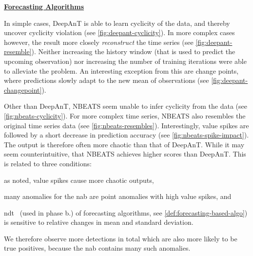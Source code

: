 \bigskip
{\large\uline{\textbf{Forecasting Algorithms}}}\\
\begin{description}[style=unboxed,leftmargin=0cm]
    \item[DeepAnT] In simple cases, DeepAnT is able to learn cyclicity of the data,
    and thereby uncover cyclicity violation (see \cref{fig:deepant-cyclicity}).
    In more complex cases however, the result more closely \textit{reconstruct}
    the time series (see \cref{fig:deepant-resemble}). Neither increasing the history window
    (that is used to predict the upcoming observation) nor increasing the number
    of training iterations were able to alleviate the problem. An interesting
    exception from this are change points, where predictions slowly adapt to the
    new mean of observations (see \cref{fig:deepant-changepoint}).
    \item[NBEATS] Other than DeepAnT, NBEATS seem unable to infer cyclicity from
    the data (see \cref{fig:nbeats-cyclicity}). For more complex time series,
    NBEATS also resembles the original time series data (see \cref{fig:nbeats-resembles}).
    Interestingly, value spikes are followed by a short decrease in prediction
    accuracy (see \cref{fig:nbeats-spike-impact}). The output is therefore often
    more chaotic than that of DeepAnT. While it may seem counterintuitive, that
    NBEATS achieves higher scores than DeepAnT. This is related to three conditions:
    \begin{enumerate*}[a.)]
        \item as noted, value spikes cause more chaotic outputs,
        \item many anomalies for the \gls{nab} are point anomalies with high value spikes, and
        \item \gls{ndt}~\cite[cf.][]{Hundman.2018} (used in phase b.) of
        forecasting algorithms, see \cref{def:forecasting-based-algo}) is sensitive
        to relative changes in mean and standard deviation.
    \end{enumerate*}
    
    We therefore observe more detections in total which are also more likely to
    be true positives, because the \gls{nab} contains many such anomalies.


\end{description}
